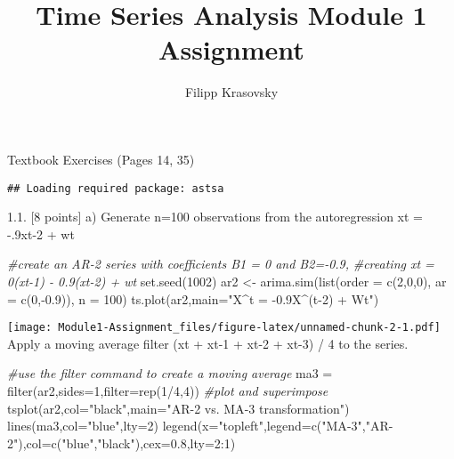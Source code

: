 \documentclass[
]{article}
\title{Time Series Analysis Module 1 Assignment}
\author{Filipp Krasovsky}
\date{}
\newenvironment{Shaded}{\begin{snugshade}}{\end{snugshade}}
\newcommand{\AttributeTok}[1]{\textcolor[rgb]{0.77,0.63,0.00}{#1}}
\newcommand{\CommentTok}[1]{\textcolor[rgb]{0.56,0.35,0.01}{\textit{#1}}}
\newcommand{\DecValTok}[1]{\textcolor[rgb]{0.00,0.00,0.81}{#1}}
\newcommand{\FloatTok}[1]{\textcolor[rgb]{0.00,0.00,0.81}{#1}}
\newcommand{\FunctionTok}[1]{\textcolor[rgb]{0.00,0.00,0.00}{#1}}
\newcommand{\NormalTok}[1]{#1}
\newcommand{\OtherTok}[1]{\textcolor[rgb]{0.56,0.35,0.01}{#1}}
\newcommand{\SpecialCharTok}[1]{\textcolor[rgb]{0.00,0.00,0.00}{#1}}
\newcommand{\StringTok}[1]{\textcolor[rgb]{0.31,0.60,0.02}{#1}}
\begin{document}
\maketitle

Textbook Exercises (Pages 14, 35)

\begin{verbatim}
## Loading required package: astsa
\end{verbatim}

1.1. {[}8 points{]} a) Generate n=100 observations from the
autoregression xt = -.9xt-2 + wt

\begin{Shaded}
\begin{Highlighting}[]
\CommentTok{\#create an AR{-}2 series with coefficients B1 = 0 and B2={-}0.9,}
\CommentTok{\#creating xt = 0(xt{-}1) {-} 0.9(xt{-}2) + wt}
\FunctionTok{set.seed}\NormalTok{(}\DecValTok{1002}\NormalTok{)}
\NormalTok{ar2 }\OtherTok{\textless{}{-}} \FunctionTok{arima.sim}\NormalTok{(}\FunctionTok{list}\NormalTok{(}\AttributeTok{order =} \FunctionTok{c}\NormalTok{(}\DecValTok{2}\NormalTok{,}\DecValTok{0}\NormalTok{,}\DecValTok{0}\NormalTok{), }\AttributeTok{ar =} \FunctionTok{c}\NormalTok{(}\DecValTok{0}\NormalTok{,}\SpecialCharTok{{-}}\FloatTok{0.9}\NormalTok{)), }\AttributeTok{n =} \DecValTok{100}\NormalTok{)}
\FunctionTok{ts.plot}\NormalTok{(ar2,}\AttributeTok{main=}\StringTok{"X\^{}t = {-}0.9X\^{}(t{-}2) + Wt"}\NormalTok{)}
\end{Highlighting}
\end{Shaded}

\texttt{[image: Module1-Assignment\_files/figure-latex/unnamed-chunk-2-1.pdf]}
Apply a moving average filter (xt + xt-1 + xt-2 + xt-3) / 4 to the
series.

\begin{Shaded}
\begin{Highlighting}[]
\CommentTok{\#use the filter command to create a moving average}
\NormalTok{ma3 }\OtherTok{=} \FunctionTok{filter}\NormalTok{(ar2,}\AttributeTok{sides=}\DecValTok{1}\NormalTok{,}\AttributeTok{filter=}\FunctionTok{rep}\NormalTok{(}\DecValTok{1}\SpecialCharTok{/}\DecValTok{4}\NormalTok{,}\DecValTok{4}\NormalTok{))}
\CommentTok{\#plot and superimpose}
\FunctionTok{tsplot}\NormalTok{(ar2,}\AttributeTok{col=}\StringTok{"black"}\NormalTok{,}\AttributeTok{main=}\StringTok{"AR{-}2 vs. MA{-}3 transformation"}\NormalTok{)}
\FunctionTok{lines}\NormalTok{(ma3,}\AttributeTok{col=}\StringTok{"blue"}\NormalTok{,}\AttributeTok{lty=}\DecValTok{2}\NormalTok{)}
\FunctionTok{legend}\NormalTok{(}\AttributeTok{x=}\StringTok{"topleft"}\NormalTok{,}\AttributeTok{legend=}\FunctionTok{c}\NormalTok{(}\StringTok{"MA{-}3"}\NormalTok{,}\StringTok{"AR{-}2"}\NormalTok{),}\AttributeTok{col=}\FunctionTok{c}\NormalTok{(}\StringTok{"blue"}\NormalTok{,}\StringTok{"black"}\NormalTok{),}\AttributeTok{cex=}\FloatTok{0.8}\NormalTok{,}\AttributeTok{lty=}\DecValTok{2}\SpecialCharTok{:}\DecValTok{1}\NormalTok{)}
\end{Highlighting}
\end{Shaded}
\end{document}

